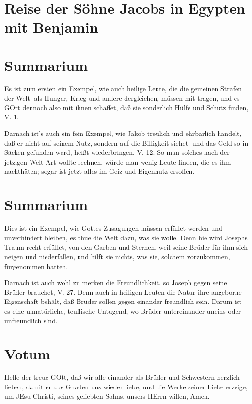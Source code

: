 \section{Reise der Söhne Jacobs in Egypten mit Benjamin}

\section{Summarium}

Es ist zum ersten ein Exempel, wie auch heilige Leute, die die gemeinen Strafen der Welt, als Hunger, Krieg und andere dergleichen, müssen mit tragen, und es GOtt dennoch also mit ihnen schaffet, daß sie sonderlich Hülfe und Schutz finden, V. 1.

Darnach ist’s auch ein fein Exempel, wie Jakob treulich und ehrbarlich handelt, daß er nicht auf seinem Nutz, sondern auf die Billigkeit siehet, und das Geld so in Säcken gefunden ward, heißt wiederbringen, V. 12. So man solches nach der jetzigen Welt Art wollte rechnen, würde man wenig Leute finden, die es ihm nachthäten; sogar ist jetzt alles im Geiz und Eigennutz ersoffen.

\section{Summarium}

Dies ist ein Exempel, wie Gottes Zusagungen müssen erfüllet werden und unverhindert bleiben, es thue die Welt dazu, was sie wolle. Denn hie wird Josephs Traum recht erfüllet, von den Garben und Sternen, weil seine Brüder für ihm sich neigen und niederfallen, und hilft sie nichts, was sie, solchem vorzukommen, fürgenommen hatten.

Darnach ist auch wohl zu merken die Freundlichkeit, so Joseph gegen seine Brüder brauchet, V. 27. Denn auch in heiligen Leuten die Natur ihre angeborne Eigenschaft behält, daß Brüder sollen gegen einander freundlich sein. Darum ist es eine unnatürliche, teuflische Untugend, wo Brüder untereinander uneins oder unfreundlich sind.

\section{Votum}

Helfe der treue GOtt, daß wir alle einander als Brüder und Schwestern herzlich lieben, damit er aus Gnaden uns wieder liebe, und die Werke seiner Liebe erzeige, um JEsu Christi, seines geliebten Sohns, unsers HErrn willen, Amen.

